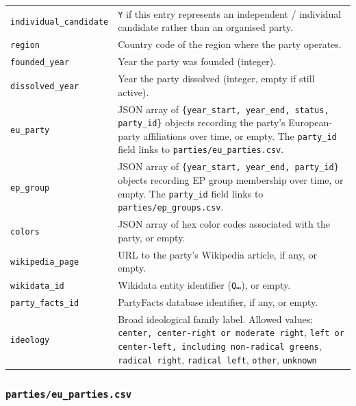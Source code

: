 \begin{longtable}{p{4.5cm}p{10.5cm}}
\texttt{individual\_candidate} & \texttt{Y} if this entry represents an
                               independent / individual candidate rather
                               than an organised party. \\
\texttt{region}             & Country code of the region where the party operates. \\
\texttt{founded\_year}      & Year the party was founded (integer). \\
\texttt{dissolved\_year}    & Year the party dissolved (integer, empty if
                               still active). \\
\texttt{eu\_party}    & JSON array of
                               \texttt{\{year\_start, year\_end, status, party\_id\}}
                               objects recording the party's European-party
                               affiliations over time, or empty. The \texttt{party\_id}
                               field links to \texttt{parties/eu\_parties.csv}. \\
\texttt{ep\_group}          & JSON array of
                               \texttt{\{year\_start, year\_end, party\_id\}}
                               objects recording EP group membership over time, or empty.
                               The \texttt{party\_id} field links to
                               \texttt{parties/ep\_groups.csv}. \\
\texttt{colors}             & JSON array of hex color codes associated with
                               the party, or empty. \\
\texttt{wikipedia\_page}    & URL to the party's Wikipedia article, if any, or empty. \\
\texttt{wikidata\_id}       & Wikidata entity identifier (\texttt{Q\ldots}), or empty. \\
\texttt{party\_facts\_id}   & PartyFacts database identifier, if any, or empty. \\
\texttt{ideology}           & Broad ideological family label. Allowed values: 
                            \texttt{center, center-right or moderate right},
                            \texttt{left or center-left, including non-radical greens},
                            \texttt{radical right},
                            \texttt{radical left}, 
                            \texttt{other},
                            \texttt{unknown} \\
\bottomrule
\end{longtable}

\subsubsection{\texttt{parties/eu\_parties.csv}}

